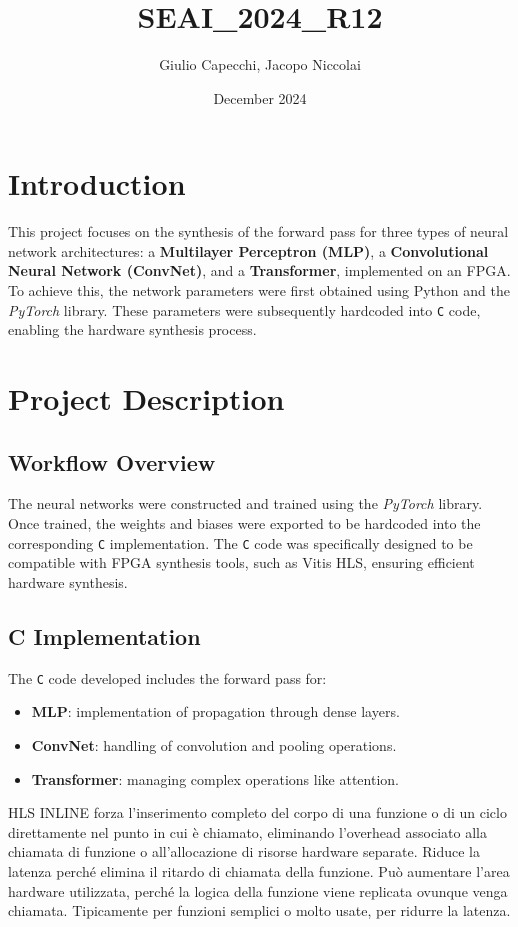 \documentclass{article}
\title{SEAI\_2024\_R12}
\author{Giulio Capecchi, Jacopo Niccolai}
\date{December 2024}
\begin{document}
\maketitle


\section{Introduction}
This project focuses on the synthesis of the forward pass for three types of neural network architectures: a \textbf{Multilayer Perceptron (MLP)}, a \textbf{Convolutional Neural Network (ConvNet)}, and a \textbf{Transformer}, implemented on an FPGA.  
To achieve this, the network parameters were first obtained using Python and the \textit{PyTorch} library. These parameters were subsequently hardcoded into \texttt{C} code, enabling the hardware synthesis process.

\section{Project Description}
\subsection{Workflow Overview}
The neural networks were constructed and trained using the \textit{PyTorch} library. Once trained, the weights and biases were exported to be hardcoded into the corresponding \texttt{C} implementation. The \texttt{C} code was specifically designed to be compatible with FPGA synthesis tools, such as Vitis HLS, ensuring efficient hardware synthesis.


\subsection{C Implementation}
The \texttt{C} code developed includes the forward pass for:
\begin{itemize}
    \item \textbf{MLP}: implementation of propagation through dense layers.
    \item \textbf{ConvNet}: handling of convolution and pooling operations.
    \item \textbf{Transformer}: managing complex operations like attention.
\end{itemize}

HLS INLINE
forza l'inserimento completo del corpo di una funzione o di un ciclo direttamente nel punto in cui è chiamato, eliminando l'overhead associato alla chiamata di funzione o all'allocazione di risorse hardware separate.
Riduce la latenza perché elimina il ritardo di chiamata della funzione. Può aumentare l'area hardware utilizzata, perché la logica della funzione viene replicata ovunque venga chiamata.
Tipicamente per funzioni semplici o molto usate, per ridurre la latenza.
\end{document}
